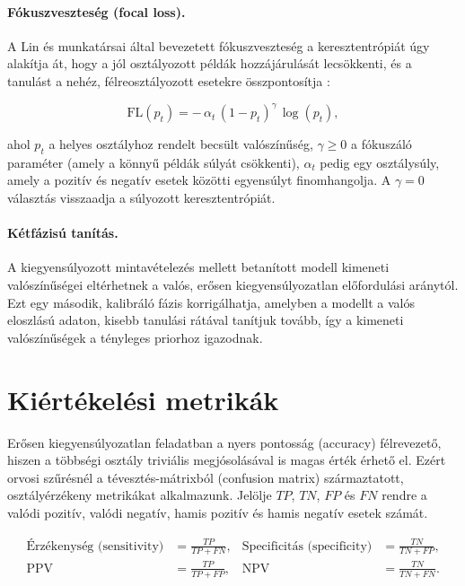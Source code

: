 \paragraph{Fókuszveszteség (focal loss).} A Lin és munkatársai által bevezetett
fókuszveszteség a keresztentrópiát úgy alakítja át, hogy a jól osztályozott
példák hozzájárulását lecsökkenti, és a tanulást a nehéz, félreosztályozott
esetekre összpontosítja \cite{lin2017focal}:

\begin{equation}
  \mathrm{FL}(p_t) = -\,\alpha_t \,(1 - p_t)^{\gamma}\, \log(p_t),
  \label{eq:focal}
\end{equation}

ahol $p_t$ a helyes osztályhoz rendelt becsült valószínűség, $\gamma \ge 0$ a
fókuszáló paraméter (amely a könnyű példák súlyát csökkenti), $\alpha_t$ pedig
egy osztálysúly, amely a pozitív és negatív esetek közötti egyensúlyt
finomhangolja. A $\gamma = 0$ választás visszaadja a súlyozott
keresztentrópiát.

\paragraph{Kétfázisú tanítás.} A kiegyensúlyozott mintavételezés mellett betanított
modell kimeneti valószínűségei eltérhetnek a valós, erősen kiegyensúlyozatlan
előfordulási aránytól. Ezt egy második, kalibráló fázis korrigálhatja, amelyben
a modellt a valós eloszlású adaton, kisebb tanulási rátával tanítjuk tovább, így
a kimeneti valószínűségek a tényleges priorhoz igazodnak.

\section{Kiértékelési metrikák}

Erősen kiegyensúlyozatlan feladatban a nyers pontosság (accuracy) félrevezető,
hiszen a többségi osztály triviális megjósolásával is magas érték érhető el.
Ezért orvosi szűrésnél a tévesztés-mátrixból (confusion matrix) származtatott,
osztályérzékeny metrikákat alkalmazunk. Jelölje $TP$, $TN$, $FP$ és $FN$ rendre a
valódi pozitív, valódi negatív, hamis pozitív és hamis negatív esetek számát.

\begin{align}
  \text{Érzékenység (sensitivity)} &= \frac{TP}{TP + FN}, &
  \text{Specificitás (specificity)} &= \frac{TN}{TN + FP}, \label{eq:sens-spec}\\
  \text{PPV} &= \frac{TP}{TP + FP}, &
  \text{NPV} &= \frac{TN}{TN + FN}. \label{eq:ppv-npv}
\end{align}

